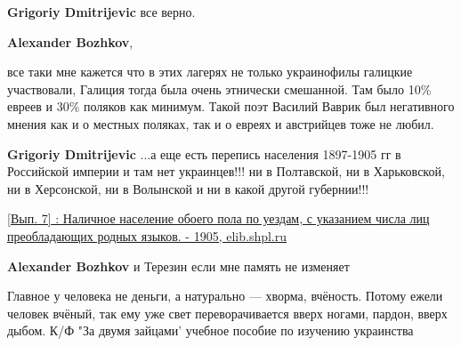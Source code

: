 \begin{itemize}
\begin{itemize}
\textbf{Grigoriy Dmitrijevic} все верно.

 
\textbf{Alexander Bozhkov}, 

все таки мне кажется что в этих лагерях не только
украинофилы галицкие участвовали, Галиция тогда была очень этнически смешанной.
Там было 10\% евреев и 30\% поляков как минимум. Такой поэт Василий Ваврик был
негативного мнения как и о местных поляках, так и о евреях и австрийцев тоже не
любил.

 
\textbf{Grigoriy Dmitrijevic} ...а еще есть перепись населения 1897-1905 гг в
Российской империи и там нет украинцев!!! ни в Полтавской, ни в Харьковской, ни
в Херсонской, ни в Волынской и ни в какой другой губернии!!!

\href{http://elib.shpl.ru/ru/nodes/15161-vyp-7-nalichnoe-naselenie-oboego-pola-po-uezdam-s-ukazaniem-chisla-lits-preobladayuschih-rodnyh-yazykov-1905}{%
[Вып. 7] : Наличное население обоего пола по уездам, с указанием числа лиц преобладающих родных языков. - 1905, %
elib.shpl.ru %
}

 
\textbf{Alexander Bozhkov} и Терезин если мне память не изменяет

\end{itemize}

 

Главное у человека не деньги, а натурально — хворма, вчёность. Потому ежели
человек вчёный, так ему уже свет переворачивается вверх ногами, пардон, вверх
дыбом. К/Ф "За двумя зайцами' учебное пособие по изучению украинства


\end{itemize}
